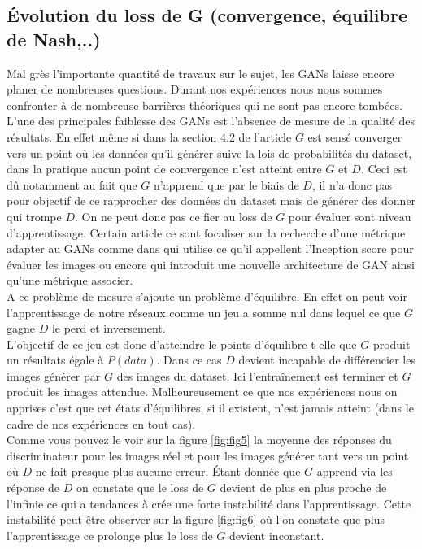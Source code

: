\documentclass[11pt,francais]{article}
\begin{document}
\subsection{Évolution du loss de G (convergence, équilibre de Nash,..)}
\label{sec:LossG_et_Convergeance}

Mal grès l'importante quantité de travaux sur le sujet, les GANs laisse encore planer de nombreuses questions.
Durant nos expériences nous nous sommes confronter à de nombreuse barrières théoriques qui ne sont pas encore tombées. 
L'une des principales faiblesse des GANs est l'absence de mesure de la qualité des résultats. En effet même si dans la section 4.2 de l'article \cite{NIPS2014_5423} \(G\) est sensé converger vers un point où les données qu'il générer suive la lois de probabilités du dataset, dans la pratique aucun point de convergence n'est atteint entre \(G\) et \(D\). Ceci est dû notamment au fait que \(G\) n'apprend que par le biais de \(D\), il n'a donc pas pour objectif de ce rapprocher des données du dataset mais de générer des donner qui trompe \(D\). On ne peut donc pas ce fier au loss de \(G\) pour évaluer sont niveau d'apprentissage.
Certain article ce sont focaliser sur la recherche d'une métrique adapter au GANs comme dans \cite{salimans2016improved} qui utilise ce qu'il appellent l'Inception score pour évaluer les images ou encore \cite{berthelot2017began} qui introduit une nouvelle architecture de GAN ainsi qu'une métrique associer.\\
A ce problème de mesure s'ajoute un problème d'équilibre.
En effet on peut voir l'apprentissage de notre réseaux comme un jeu a somme nul dans lequel ce que \(G\) gagne \(D\) le perd et inversement.\\
L'objectif de ce jeu est donc d'atteindre le points d'équilibre t-elle que \(G\) produit un résultats égale à \(P(data)\). Dans ce cas \(D\) devient incapable de différencier les images générer par \(G\) des images du dataset. Ici l'entraînement est terminer et \(G\) produit les images attendue.
Malheureusement ce que nos expériences nous on apprises c'est que cet états d'équilibres, si il existent, n'est jamais atteint (dans le cadre de nos expériences en tout cas).\\
Comme vous pouvez le voir sur la figure \ref{fig:fig5} la moyenne des réponses du discriminateur pour les images réel et pour les images générer tant vers un point où \(D\) ne fait presque plus aucune erreur. Étant donnée que \(G\) apprend via les réponse de \(D\) on constate que le loss de \(G\) devient de plus en plus proche de l'infinie ce qui a tendances à crée une forte instabilité dans l'apprentissage. Cette instabilité peut être observer sur la figure \ref{fig:fig6} où l'on constate que plus l'apprentissage ce prolonge plus le loss de \(G\) devient inconstant. 
\end{document}
